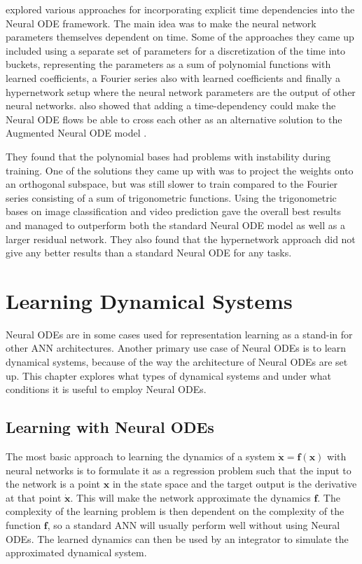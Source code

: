 \documentclass[12pt,a4paper]{book}
\begin{document}
\cite{timedependencenode} explored various approaches for incorporating explicit time dependencies into the Neural ODE framework. The main idea was to make the neural network parameters themselves dependent on time. Some of the approaches they came up included using a separate set of parameters for a discretization of the time into buckets, representing the parameters as a sum of polynomial functions with learned coefficients, a Fourier series also with learned coefficients and finally a hypernetwork setup where the neural network parameters are the output of other neural networks. \cite{timedependencenode} also showed that adding a time-dependency could make the Neural ODE flows be able to cross each other as an alternative solution to the Augmented Neural ODE model \citep{dupont2019augmented}.

They found that the polynomial bases had problems with instability during training. One of the solutions they came up with was to project the weights onto an orthogonal subspace, but was still slower to train compared to the Fourier series consisting of a sum of trigonometric functions. Using the trigonometric bases on image classification and video prediction gave the overall best results and managed to outperform both the standard Neural ODE model as well as a larger residual network. They also found that the hypernetwork approach did not give any better results than a standard Neural ODE for any tasks.

\chapter{Learning Dynamical Systems}
\label{cha:learningdynamicalsystems}

Neural ODEs are in some cases used for representation learning as a stand-in for other ANN architectures. Another primary use case of Neural ODEs is to learn dynamical systems, because of the way the architecture of Neural ODEs are set up. This chapter explores what types of dynamical systems and under what conditions it is useful to employ Neural ODEs.

\section{Learning with Neural ODEs}

The most basic approach to learning the dynamics of a system $\dot{\bm{x}} = \bm{f}(\bm{x})$ with neural networks is to formulate it as a regression problem such that the input to the network is a point $\bm{x}$ in the state space and the target output is the derivative at that point $\dot{\bm{x}}$. This will make the network approximate the dynamics $\bm{f}$. The complexity of the learning problem is then dependent on the complexity of the function $\bm{f}$, so a standard ANN will usually perform well without using Neural ODEs. The learned dynamics can then be used by an integrator to simulate the approximated dynamical system.
\end{document}
